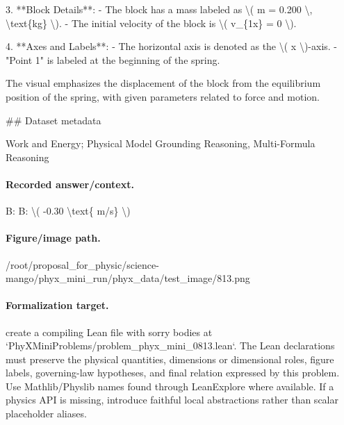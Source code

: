 3. **Block Details**:
   - The block has a mass labeled as \textbackslash{}( m = 0.200 \textbackslash{}, \textbackslash{}text\{kg\} \textbackslash{}).
   - The initial velocity of the block is \textbackslash{}( v\_\{1x\} = 0 \textbackslash{}).

4. **Axes and Labels**:
   - The horizontal axis is denoted as the \textbackslash{}( x \textbackslash{})-axis.
   - "Point 1" is labeled at the beginning of the spring.

The visual emphasizes the displacement of the block from the equilibrium position of the spring, with given parameters related to force and motion.

\#\# Dataset metadata

Work and Energy; Physical Model Grounding Reasoning, Multi-Formula Reasoning

\paragraph{Recorded answer/context.}
B: B: \textbackslash{}( -0.30 \textbackslash{}text\{ m/s\} \textbackslash{})

\paragraph{Figure/image path.}
/root/proposal\_for\_physic/science-mango/phyx\_mini\_run/phyx\_data/test\_image/813.png

\paragraph{Formalization target.}
create a compiling Lean file with sorry bodies at `PhyXMiniProblems/problem\_phyx\_mini\_0813.lean`. The Lean declarations must preserve the physical quantities, dimensions or dimensional roles, figure labels, governing-law hypotheses, and final relation expressed by this problem.
Use Mathlib/Physlib names found through LeanExplore where available. If a physics API is missing, introduce faithful local abstractions rather than scalar placeholder aliases.

